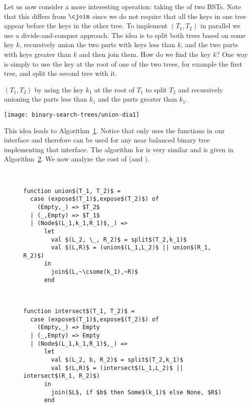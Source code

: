 Let us now consider a more interesting operation: taking the
 of two BSTs.  Note that this differs from $\cjoin$ since
we do not require that all the keys in one tree appear before the
keys in the other tree.  To implement $(T_1,T_2)$ in
parallel we use a divide-and-conquer approach.  The idea is to split
both trees based on some key $k$, recursively union the two parts with
keys less than $k$, and the two parts with keys greater than $k$ and
then join them.  How do we find the key $k$?  One way is simply to use
the key at the root of one of the two trees, for example the first tree,
and split the second tree with it.
\begin{example}
$(T_1,T_2)$ by using the key $k_1$ at the root of $T_1$ to
split $T_2$ and recursively unioning the parts less than $k_1$ and the
parts greater than $k_1$.
\begin{center}
  \texttt{[image: binary-search-trees/union-dia1]}
\end{center}
\label{example:tree-union}
\end{example}
This idea leads to Algorithm~\ref{alg:union}.  
Notice that  only uses the functions in our
 interface and therefore can be used for any near
balanced binary tree implementing that interface.  The algorithm for
 is very similar and is given in
Algorithm~\ref{alg:intersect}.  We now analyze the cost of
 (and ).

\begin{figure}
\begin{algorithm}~
\label{alg:union}
\begin{lstlisting}
function union$(T_1, T_2)$ =
  case (expose$(T_1)$,expose$(T_2)$) of
    (Empty,_) => $T_2$
  | (_,Empty) => $T_1$
  | (Node$(L_1,k_1,R_1)$,_) =>
      let 
        val $(L_2, \_, R_2)$ = split$(T_2,k_1)$
        val $(L,R)$ = (union$(L_1,L_2)$ || union$(R_1, R_2)$)
      in 
        join$(L,~\csome(k_1),~R)$
      end
\end{lstlisting}
\end{algorithm}
\end{figure}

\begin{figure}
\begin{algorithm}~
\label{alg:intersect}
\begin{lstlisting}
function intersect$(T_1, T_2)$ =
  case (expose$(T_1)$,expose$(T_2)$) of
    (Empty,_) => Empty
  | (_,Empty) => Empty
  | (Node$(L_1,k_1,R_1)$,_) =>
      let 
        val $(L_2, b, R_2)$ = split$(T_2,k_1)$
        val $(L,R)$ = (intersect$(L_1,L_2)$ || intersect$(R_1, R_2)$)
      in 
        join($L$, if $b$ then Some$(k_1)$ else None, $R$)
      end
\end{lstlisting}
\end{algorithm}
\end{figure}


